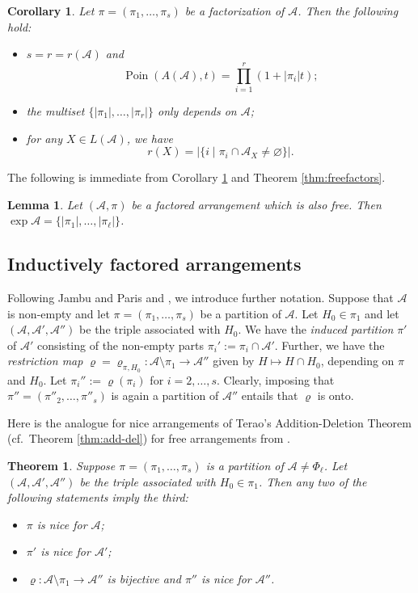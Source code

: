 \documentclass[12pt]{amsart}
\newcommand\CA{{\mathscr A}}
\newcommand\R{{\varrho}}
\newcommand\Poin{{\operatorname{Poin}}}
\numberwithin{equation}{section}
\theoremstyle{plain}
\newtheorem{lemma}[equation]{Lemma}
\newtheorem{theorem}[equation]{Theorem}
\newtheorem{corollary}[equation]{Corollary}
\theoremstyle{definition}
\begin{document}
\begin{corollary}
	\label{cor:teraofactored}
	Let  $\pi = (\pi_1, \ldots, \pi_s)$ be a factorization of $\CA$.
	Then the following hold:
	\begin{itemize}
		\item[(i)] $s = r = r(\CA)$ and
		\[
		\Poin(A(\CA),t) = \prod_{i=1}^r (1 + |\pi_i|t);
		\]
		\item[(ii)]
		the multiset $\{|\pi_1|, \ldots, |\pi_r|\}$ only depends on $\CA$;
		\item[(iii)]
		for any $X \in L(\CA)$, we have
		\[
		r(X) = |\{ i \mid \pi_i \cap \CA_X \ne \varnothing \}|.
		\]
	\end{itemize}
\end{corollary}

	The following is immediate from
		Corollary \ref{cor:teraofactored} and Theorem \ref{thm:freefactors}.

	\begin{lemma}
		\label{lem:FactoredFree}
		Let $(\CA,\pi)$ be a factored arrangement which is also free.
		Then $\exp{\CA} = \{|\pi_1|,\ldots,|\pi_\ell|\}$.
	\end{lemma}

\subsection{Inductively factored arrangements}
\label{sec:indfactored}

Following Jambu and Paris
\cite{jambuparis:factored} and \cite{hogeroehrle:factored},
we introduce further notation.
Suppose that $\CA$ is non-empty and
let $\pi = (\pi_1, \ldots, \pi_s)$ be a  partition  of $\CA$.
Let $H_0 \in \pi_1$ and let
$(\CA, \CA', \CA'')$ be the triple associated with $H_0$.
We have the \emph{induced partition}
$\pi'$ of $\CA'$
consisting of the non-empty parts $\pi_i' := \pi_i \cap \CA'$.
Further, we have the \emph{restriction map}
$\R = \R_{\pi,H_0} : \CA \setminus \pi_1 \to \CA''$ given by
$H \mapsto H \cap H_0$, depending on $\pi$ and $H_0$.
Let $\pi_i'' := \R(\pi_i)$ for $i = 2, \ldots, s$.
Clearly, imposing that
$\pi'' = (\pi''_2, \ldots, \pi''_s)$ is
again a partition of $\CA''$ entails that
$\R$ is onto.

Here is the analogue for nice arrangements of Terao's
Addition-Deletion Theorem (cf.~Theorem \ref{thm:add-del}) for free arrangements from
\cite{hogeroehrle:factored}.

\begin{theorem}  
	\label{thm:add-del-factored}
	Suppose 
	$\pi = (\pi_1, \ldots, \pi_s)$ is a  partition  of $\CA  \ne \Phi_\ell$.
	Let 
	$(\CA, \CA', \CA'')$ be the triple associated with $H_0  \in \pi_1$.
	Then any two of the following statements imply the third:
	\begin{itemize}
		\item[(i)] $\pi$ is nice for $\CA$;
		\item[(ii)] $\pi'$ is nice for $\CA'$;
		\item[(iii)] $\R: \CA \setminus \pi_1 \to \CA''$
		is bijective and $\pi''$ is nice for $\CA''$.
	\end{itemize}
\end{theorem}
\end{document}
